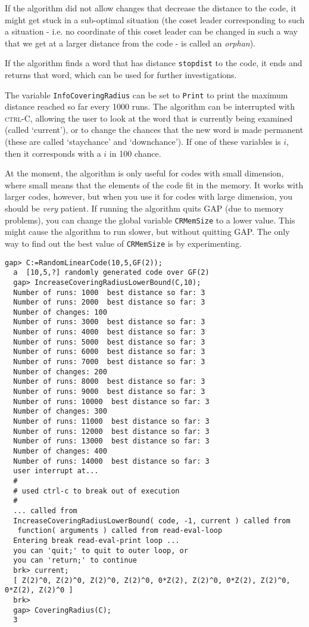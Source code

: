 \documentclass[11pt]{report}
\begin{document}
{{{ If the algorithm did not allow changes that decrease the distance to the code,
it might get stuck in a sub-optimal situation (the coset leader corresponding
to such a situation - i.e. no coordinate of this coset leader can be changed
in such a way that we get at a larger distance from the code - is called an \emph{orphan}). 

 If the algorithm finds a word that has distance \mbox{\texttt{stopdist}} to the code, it ends and returns that word, which can be used for further
investigations. 

 The variable \mbox{\texttt{InfoCoveringRadius}} can be set to \mbox{\texttt{Print}} to print the maximum distance reached so far every 1000 runs. The algorithm
can be interrupted with \textsc{ctrl-C}, allowing the user to look at the word that is currently being examined
(called `current'), or to change the chances that the new word is made
permanent (these are called `staychance' and `downchance'). If one of these
variables is $i$, then it corresponds with a $i$ in 100 chance. 

 At the moment, the algorithm is only useful for codes with small dimension,
where small means that the elements of the code fit in the memory. It works
with larger codes, however, but when you use it for codes with large
dimension, you should be \emph{very} patient. If running the algorithm quits \textsf{GAP} (due to memory problems), you can change the global variable \mbox{\texttt{CRMemSize}} to a lower value. This might cause the algorithm to run slower, but without
quitting \textsf{GAP}. The only way to find out the best value of \mbox{\texttt{CRMemSize}} is by experimenting. }

 
\begin{Verbatim}[fontsize=\small,frame=single,label=Example]
  gap> C:=RandomLinearCode(10,5,GF(2));
  a  [10,5,?] randomly generated code over GF(2)
  gap> IncreaseCoveringRadiusLowerBound(C,10);
  Number of runs: 1000  best distance so far: 3
  Number of runs: 2000  best distance so far: 3
  Number of changes: 100
  Number of runs: 3000  best distance so far: 3
  Number of runs: 4000  best distance so far: 3
  Number of runs: 5000  best distance so far: 3
  Number of runs: 6000  best distance so far: 3
  Number of runs: 7000  best distance so far: 3
  Number of changes: 200
  Number of runs: 8000  best distance so far: 3
  Number of runs: 9000  best distance so far: 3
  Number of runs: 10000  best distance so far: 3
  Number of changes: 300
  Number of runs: 11000  best distance so far: 3
  Number of runs: 12000  best distance so far: 3
  Number of runs: 13000  best distance so far: 3
  Number of changes: 400
  Number of runs: 14000  best distance so far: 3
  user interrupt at... 
  #
  # used ctrl-c to break out of execution
  #
  ... called from 
  IncreaseCoveringRadiusLowerBound( code, -1, current ) called from
   function( arguments ) called from read-eval-loop
  Entering break read-eval-print loop ...
  you can 'quit;' to quit to outer loop, or
  you can 'return;' to continue
  brk> current;
  [ Z(2)^0, Z(2)^0, Z(2)^0, Z(2)^0, 0*Z(2), Z(2)^0, 0*Z(2), Z(2)^0, 0*Z(2), Z(2)^0 ]
  brk>
  gap> CoveringRadius(C);
  3
  

\end{Verbatim}}}
\end{document}
